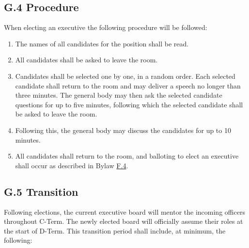 \documentclass[11pt,a4paper]{article}
\begin{document}
\subsection*{G.4 Procedure}
When electing an executive the following procedure will be followed:
\begin{enumerate}
    \item The names of all candidates for the position shall be read.
    \item All candidates shall be asked to leave the room.
    \item Candidates shall be selected one by one, in a random order. Each selected candidate shall return to the room and may deliver a speech no longer than three minutes. The general body may then ask the selected candidate questions for up to five minutes, following which the selected candidate shall be asked to leave the room.
    \item Following this, the general body may discuss the candidates for up to 10 minutes.
    \item All candidates shall return to the room, and balloting to elect an executive shall occur as described in Bylaw \hyperref[F.4]{F.4}.
\end{enumerate}

\subsection*{G.5 Transition}



Following elections, the current executive board will mentor the incoming officers throughout C-Term. The newly elected board will officially assume their roles at the start of D-Term. This transition period shall include, at minimum, the following:
\end{document}

